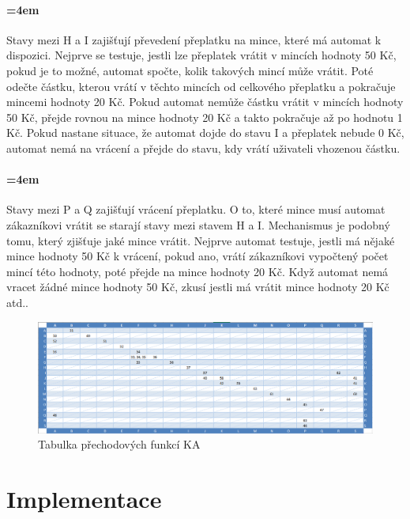 \documentclass[12pt,a4paper]{article}
\begin{document}
\paragraph{\parindent=4em}{	
	Stavy mezi H a I zajišťují převedení přeplatku na mince, které má automat k dispozici. Nejprve se testuje, jestli lze přeplatek vrátit v mincích hodnoty 50 Kč, pokud je to možné, automat spočte, kolik takových mincí může vrátit. Poté odečte částku, kterou vrátí v těchto mincích od celkového přeplatku a pokračuje mincemi hodnoty 20 Kč. Pokud automat nemůže částku vrátit v mincích hodnoty 50 Kč, přejde rovnou na mince hodnoty 20 Kč a takto pokračuje až po hodnotu 1 Kč. Pokud nastane situace, že automat dojde do stavu I a přeplatek nebude 0 Kč, automat nemá na vrácení a přejde do stavu, kdy vrátí uživateli vhozenou částku.
}	

\paragraph{\parindent=4em}{	
	Stavy mezi P a Q zajišťují vrácení přeplatku. O to, které mince musí automat zákazníkovi vrátit se starají stavy mezi stavem H a I. Mechanismus je podobný tomu, který zjišťuje jaké mince vrátit. Nejprve automat testuje, jestli má nějaké mince hodnoty 50 Kč k vrácení, pokud ano, vrátí zákazníkovi vypočtený počet mincí této hodnoty, poté přejde na mince hodnoty 20 Kč. Když automat nemá vracet žádné mince hodnoty 50 Kč, zkusí jestli má vrátit mince hodnoty 20 Kč atd..
}	

\begin{figure}[H]	
	\centering
	\includegraphics[width=\textwidth]{images/tabulka_prechodovych_funkci}
	\caption{Tabulka přechodových funkcí KA}
\end{figure}

\section{Implementace}
\end{document}
